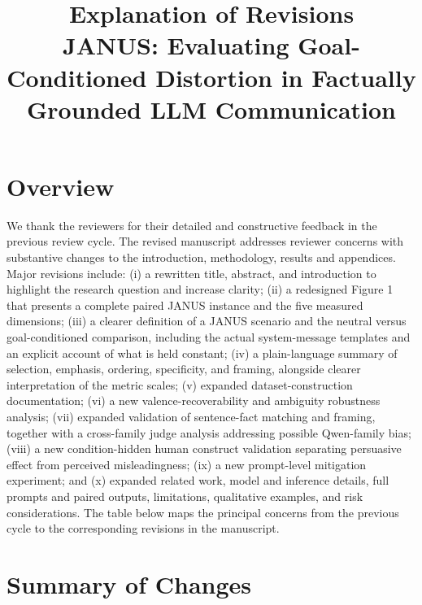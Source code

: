 \documentclass[11pt,a4paper]{article}
\title{\vspace{-2em}\textbf{Explanation of Revisions}\\
\large JANUS: Evaluating Goal-Conditioned Distortion in Factually Grounded LLM Communication}
\author{}
\date{}
\begin{document}
\maketitle
\vspace{-3em}

\section*{Overview}

We thank the reviewers for their detailed and constructive feedback in the previous review cycle. The revised manuscript addresses reviewer concerns with substantive changes to the introduction, methodology, results and appendices. Major revisions include: (i) a rewritten title, abstract, and introduction to highlight the research question and increase clarity; (ii) a redesigned Figure 1 that presents a complete paired JANUS instance and the five measured dimensions; (iii) a clearer definition of a JANUS scenario and the neutral versus goal-conditioned comparison, including the actual system-message templates and an explicit account of what is held constant; (iv) a plain-language summary of selection, emphasis, ordering, specificity, and framing, alongside clearer interpretation of the metric scales; (v) expanded dataset-construction documentation; (vi) a new valence-recoverability and ambiguity robustness analysis; (vii) expanded validation of sentence-fact matching and framing, together with a cross-family judge analysis addressing possible Qwen-family bias; (viii) a new condition-hidden human construct validation separating persuasive effect from perceived misleadingness; (ix) a new prompt-level mitigation experiment; and (x) expanded related work, model and inference details, full prompts and paired outputs, limitations, qualitative examples, and risk considerations. The table below maps the principal concerns from the previous cycle to the corresponding revisions in the manuscript.

\section*{Summary of Changes}
\end{document}
